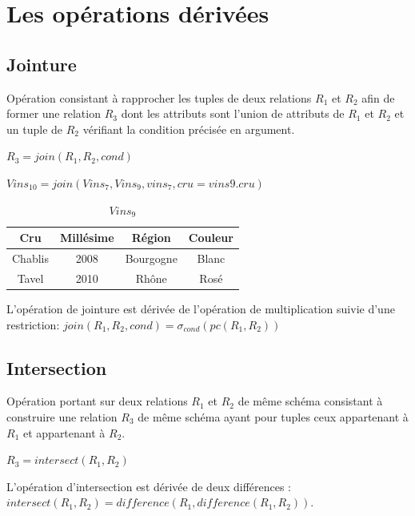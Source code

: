 \documentclass[12pt,a4paper,openany]{book}
\begin{document}
	\section{Les opérations dérivées}
	\subsection{Jointure}
	\begin{definition}
		Opération consistant à rapprocher les tuples de deux relations $R_1$ et $R_2$ afin de former une relation $R_3$ dont les attributs
		sont l'union de attributs de $R_1$ et $R_2$ et un tuple de $R_2$ vérifiant la condition précisée en argument.
	\end{definition}
	\begin{notation}
		$R_3 = join(R_1, R_2, cond)$
	\end{notation}
	\begin{exemple}
		$Vins_{10} = join(Vins_7, Vins_9, vins_7, cru=vins9.cru)$
		\begin{table}[H]
			\centering
			\begin{tabular}{c|c|c|c}
				\textbf{Cru} & \textbf{Millésime} & \textbf{Région} & \textbf{Couleur}\\
				\hline
				Chablis & 2008 & Bourgogne & Blanc\\
				Tavel & 2010 & Rhône & Rosé\\
			\end{tabular}
			\caption{$Vins_9$}
		\end{table}
	\end{exemple}

		L'opération de jointure est dérivée de l'opération de multiplication suivie d'une restriction: $join(R_1,R_2,cond) = \sigma_{cond}(pc(R_1,R_2))$

	\subsection{Intersection}
	\begin{definition}
		Opération portant sur deux relations $R_1$ et $R_2$ de même schéma consistant à construire une relation $R_3$ de même schéma ayant pour tuples
		ceux appartenant à $R_1$ et appartenant à $R_2$.
	\end{definition}
	\begin{notation}
		$R_3 = intersect(R_1, R_2)$
	\end{notation}

	L'opération d'intersection est dérivée de deux différences : \\$intersect(R_1, R_2) = difference(R_1, difference(R_1, R_2))$.
\end{document}
